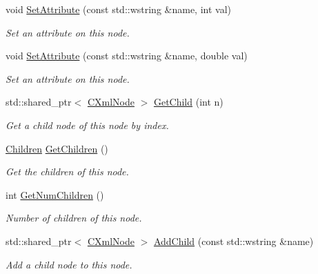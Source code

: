 \begin{DoxyCompactItemize}
void \hyperlink{classxmlnode_1_1_c_xml_node_a6771d1de541ffefcf8a4fcd809b12b62}{Set\+Attribute} (const std\+::wstring \&name, int val)
\begin{DoxyCompactList}\small\item\em Set an attribute on this node. \end{DoxyCompactList}\item 
void \hyperlink{classxmlnode_1_1_c_xml_node_a1bfd97eb8de5e6f769b5ed29039b91ea}{Set\+Attribute} (const std\+::wstring \&name, double val)
\begin{DoxyCompactList}\small\item\em Set an attribute on this node. \end{DoxyCompactList}\item 
std\+::shared\+\_\+ptr$<$ \hyperlink{classxmlnode_1_1_c_xml_node}{C\+Xml\+Node} $>$ \hyperlink{classxmlnode_1_1_c_xml_node_ac5700bda1faebcbe5bb042e043ea60be}{Get\+Child} (int n)
\begin{DoxyCompactList}\small\item\em Get a child node of this node by index. \end{DoxyCompactList}\item 
\hyperlink{classxmlnode_1_1_c_xml_node_1_1_children}{Children} \hyperlink{classxmlnode_1_1_c_xml_node_a03f86570ca40d4cc09c3e1841939a9d0}{Get\+Children} ()
\begin{DoxyCompactList}\small\item\em Get the children of this node. \end{DoxyCompactList}\item 
int \hyperlink{classxmlnode_1_1_c_xml_node_ab455bd55e7f3dbd550e81d7fe293d146}{Get\+Num\+Children} ()
\begin{DoxyCompactList}\small\item\em Number of children of this node. \end{DoxyCompactList}\item 
std\+::shared\+\_\+ptr$<$ \hyperlink{classxmlnode_1_1_c_xml_node}{C\+Xml\+Node} $>$ \hyperlink{classxmlnode_1_1_c_xml_node_a7227a654358ffb87a2a57c165dee509c}{Add\+Child} (const std\+::wstring \&name)
\begin{DoxyCompactList}\small\item\em Add a child node to this node. \end{DoxyCompactList}\end{DoxyCompactItemize}
